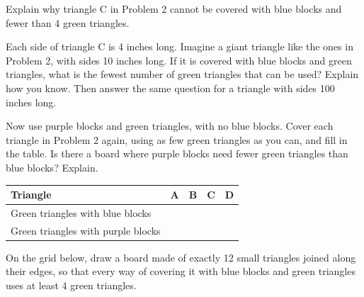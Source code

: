 \documentclass[12pt]{article}
\begin{document}
\vspace{0.45in}

\newpage


\vspace{0.6in}

\newpage

 Explain why triangle C in Problem 2 cannot be covered with blue blocks and fewer than 4 green triangles.

\vspace{3.6in}
 Each side of triangle C is 4 inches long. Imagine a giant triangle like the ones in Problem 2, with sides 10 inches long. If it is covered with blue blocks and green triangles, what is the fewest number of green triangles that can be used? Explain how you know. Then answer the same question for a triangle with sides 100 inches long.

\newpage

 Now use purple blocks and green triangles, with no blue blocks. Cover each triangle in Problem 2 again, using as few green triangles as you can, and fill in the table. Is there a board where purple blocks need fewer green triangles than blue blocks? Explain.

\vspace{0.4in}
\centering
\renewcommand{\arraystretch}{2.2}
\begin{tabular}{|l|>{\centering\arraybackslash}p{0.75in}|>{\centering\arraybackslash}p{0.75in}|>{\centering\arraybackslash}p{0.75in}|>{\centering\arraybackslash}p{0.75in}|}
\hline
Triangle & A & B & C & D\\ \hline
Green triangles with blue blocks & & & & \\ \hline
Green triangles with purple blocks & & & & \\ \hline
\end{tabular}

\raggedright
\newpage

 On the grid below, draw a board made of exactly 12 small triangles joined along their edges, so that every way of covering it with blue blocks and green triangles uses at least 4 green triangles.

\vspace{0.4in}
\centering
{}
\end{document}
